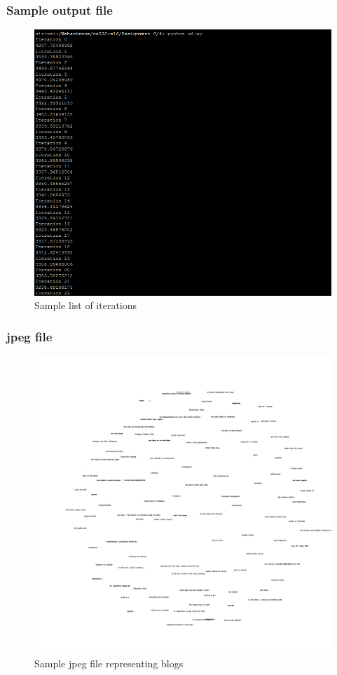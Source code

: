 \subsubsection{Sample output file}
\begin{figure}[ht]    
    \begin{center}
        \includegraphics[scale=0.8]{output4.png}
        \caption{Sample list of iterations}
        \label{Sample4_t1}
    \end{center}
\end{figure}
\newpage
\subsubsection{jpeg file}
\begin{figure}[ht]    
    \begin{center}
        \includegraphics[scale=0.24]{blogs.jpg}
        \caption{Sample jpeg file representing blogs}
        \label{Sample4_t2}
    \end{center}
\end{figure}
\newpage

